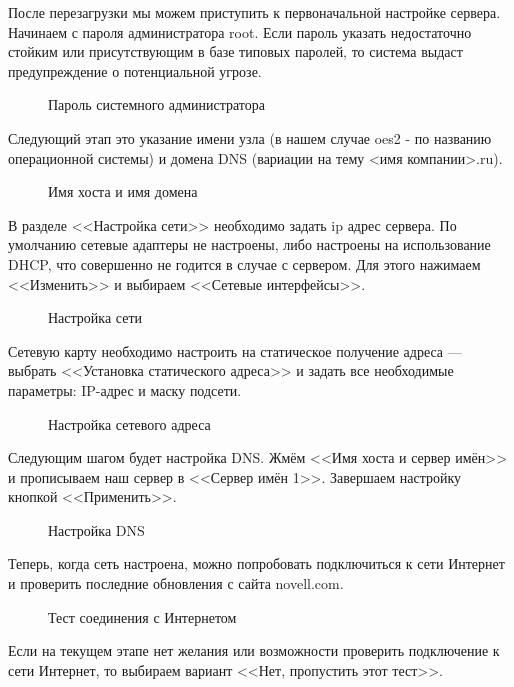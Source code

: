 После перезагрузки мы можем приступить к первоначальной настройке сервера.\\
Начинаем с пароля администратора root. Если пароль указать недостаточно стойким или присутствующим в базе типовых паролей, то система выдаст предупреждение о потенциальной угрозе.
\begin{figure}[H]
\caption{Пароль системного администратора}
\label{fig6}
\end{figure}
\clearpage

Следующий этап это указание имени узла (в нашем случае oes2 - по названию операционной системы) и домена DNS (вариации на тему <имя компании>.ru).
\begin{figure}[H]
\caption{Имя хоста и имя домена}
\label{fig7}
\end{figure}
\clearpage

В разделе <<Настройка сети>> необходимо задать ip адрес сервера. По умолчанию сетевые адаптеры не настроены, либо настроены на использование DHCP, что совершенно не годится в случае с сервером. Для этого нажимаем <<Изменить>> и выбираем <<Сетевые интерфейсы>>.
\begin{figure}[H]
\caption{Настройка сети}
\label{figNetworkall}
\end{figure}
\clearpage

Сетевую карту необходимо настроить на статическое получение адреса — выбрать <<Установка статического адреса>> и задать все необходимые параметры: IP-адрес и маску подсети.
\begin{figure}[H]
\caption{Настройка сетевого адреса}
\label{fig8}
\end{figure}
\clearpage

Следующим шагом будет настройка DNS. Жмём <<Имя хоста и сервер имён>> и прописываем наш сервер в <<Сервер имён 1>>. Завершаем настройку кнопкой <<Применить>>.
\begin{figure}[H]
\caption{Настройка DNS}
\label{fig9}
\end{figure}
\clearpage

Теперь, когда сеть настроена, можно попробовать подключиться к сети Интернет и проверить последние обновления с сайта novell.com.
\begin{figure}[H]
\caption{Тест соединения с Интернетом}
\label{fig10}
\end{figure}
Если на текущем этапе нет желания или возможности проверить подключение к сети Интернет, то выбираем вариант <<Нет, пропустить этот тест>>.
\clearpage

